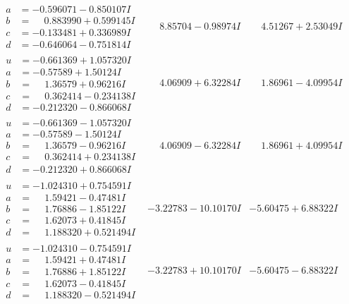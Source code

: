 \documentclass[1p]{elsarticle_modified}
\theoremstyle{definition}
\begin{document}
$$\begin{array}{c|c|c}
\begin{aligned}
a &= -0.596071 - 0.850107 I \\
b &= \phantom{-}0.883990 + 0.599145 I \\
c &= -0.133481 + 0.336989 I \\
d &= -0.646064 - 0.751814 I\end{aligned}
 & \phantom{-}8.85704 - 0.98974 I & \phantom{-}4.51267 + 2.53049 I \\ \hline\begin{aligned}
u &= -0.661369 + 1.057320 I \\
a &= -0.57589 + 1.50124 I \\
b &= \phantom{-}1.36579 + 0.96216 I \\
c &= \phantom{-}0.362414 - 0.234138 I \\
d &= -0.212320 - 0.866068 I\end{aligned}
 & \phantom{-}4.06909 + 6.32284 I & \phantom{-}1.86961 - 4.09954 I \\ \hline\begin{aligned}
u &= -0.661369 - 1.057320 I \\
a &= -0.57589 - 1.50124 I \\
b &= \phantom{-}1.36579 - 0.96216 I \\
c &= \phantom{-}0.362414 + 0.234138 I \\
d &= -0.212320 + 0.866068 I\end{aligned}
 & \phantom{-}4.06909 - 6.32284 I & \phantom{-}1.86961 + 4.09954 I \\ \hline\begin{aligned}
u &= -1.024310 + 0.754591 I \\
a &= \phantom{-}1.59421 - 0.47481 I \\
b &= \phantom{-}1.76886 - 1.85122 I \\
c &= \phantom{-}1.62073 + 0.41845 I \\
d &= \phantom{-}1.188320 + 0.521494 I\end{aligned}
 & -3.22783 - 10.10170 I & -5.60475 + 6.88322 I \\ \hline\begin{aligned}
u &= -1.024310 - 0.754591 I \\
a &= \phantom{-}1.59421 + 0.47481 I \\
b &= \phantom{-}1.76886 + 1.85122 I \\
c &= \phantom{-}1.62073 - 0.41845 I \\
d &= \phantom{-}1.188320 - 0.521494 I\end{aligned}
 & -3.22783 + 10.10170 I & -5.60475 - 6.88322 I\\

\end{array}$$
\end{document}
